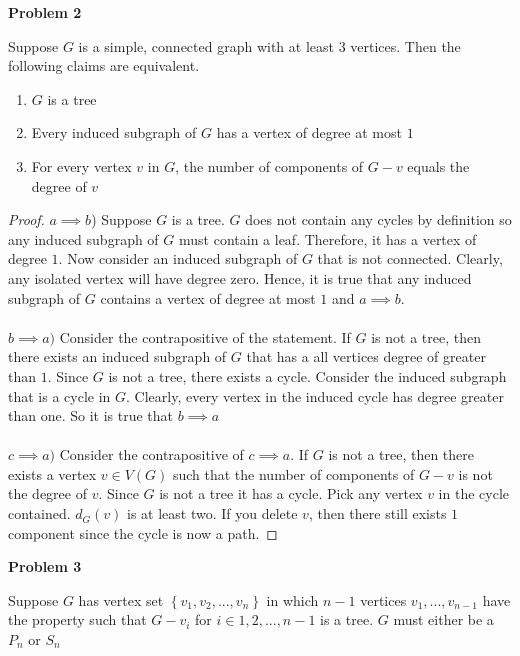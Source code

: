 \documentclass{article}
\newenvironment{claim}[2][Claim]{\begin{trivlist}
		\item[\hskip \labelsep {\bfseries #1}\hskip \labelsep {\bfseries #2}]}{\end{trivlist}}
\begin{document}
\noindent \textbf{Problem 2}
\begin{claim}{1}
	Suppose $G$ is a simple, connected graph with at least $3$ vertices. Then the following claims are equivalent.
	\begin{enumerate}[label=\alph*)]
		\item $G$ is a tree
		\item Every induced subgraph of $G$ has a vertex of degree at most $1$
		\item For every vertex $v$ in $G$, the number of components of $G - v$ equals the degree of $v$
	\end{enumerate}
\end{claim}
\begin{proof}
	$a \implies b$) Suppose $G$ is a tree. $G$ does not contain any cycles by definition so any induced subgraph of $G$ must contain a leaf. Therefore, it has a vertex of degree $1$. Now consider an induced subgraph of $G$ that is not connected. Clearly, any isolated vertex will have degree zero. Hence, it is true that any induced subgraph of $G$ contains a vertex of degree at most $1$ and $a \implies b$.\\ \\
	$b \implies a)$ Consider the contrapositive of the statement. If $G$ is not a tree, then there exists an induced subgraph of $G$ that has a all vertices degree of greater than $1$. Since $G$ is not a tree, there exists a cycle. Consider the induced subgraph that is a cycle in $G$. Clearly, every vertex in the induced cycle has degree greater than one. So it is true that $b \implies a$\\ \\
	$c \implies a)$ Consider the contrapositive of $c \implies a$. If $G$ is not a tree, then there exists a vertex $v \in V(G)$ such that the number of components of $G - v$ is not the degree of $v$. Since $G$ is not a tree it has a cycle. Pick any vertex $v$ in the cycle contained. $d_G(v)$ is at least two. If you delete $v$, then there still exists $1$ component since the cycle is now a path.
\end{proof}
\newpage
\noindent \textbf{Problem 3}
\begin{claim}{}
	Suppose $G$ has vertex set $\left \{ v_1, v_2, ..., v_n \right \}$ in which $n-1$ vertices $v_1, ... , v_{n-1}$ have the property such that $G - v_i$ for $i \in 1,2,..., n - 1$ is a tree. $G$ must either be a $P_n$ or $S_n$ 
\end{claim}
\end{document}
